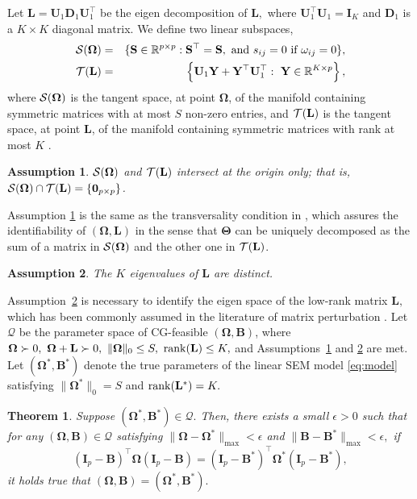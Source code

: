 \documentclass[12pt]{article}
\newtheorem{theorem}{Theorem}
\newcommand{\PA}{{\mathcal Q}}
\def\rank{\mathop{\rm rank}}
\newtheorem{Assumption}{Assumption}
\newcommand{\OOO}{\boldsymbol \Omega}
\newcommand{\TTT}{\boldsymbol \Theta}
\newcommand{\BB}{\mathbf B}
\newcommand{\DD}{\mathbf D}
\newcommand{\YY}{\mbox{$\mathbf Y$}}
\newcommand{\II}{\mathbf I}
\newcommand{\LL}{\mathbf L}
\newcommand{\R}{\mathbb R}
\newcommand{\SSS}{\mathbf S}
\newcommand{\UU}{\mathbf U}
\newcommand{\1}{\uppercase\expandafter{\romannumeral1}}
\newcommand{\2}{\uppercase\expandafter{\romannumeral2}}
\newcommand{\0}{\textbf{0}}
\begin{document}
Let $\LL = \UU_1 \DD_1 \UU_1^\top$ be the eigen decomposition of $\LL,$ where $\UU_1^\top \UU_1 = \II_K$ and $\DD_1$ is a $K\times K$ diagonal matrix. We define two linear subspaces, 
\begin{eqnarray}
{\cal S}(\OOO) &=& \{\SSS\in\R^{p\times p}: \SSS^\top = \SSS,~\text{and}~s_{ij} = 0~\text{if}~\omega_{ij} = 0\}, \label{eq:tangent S} \\
{\cal T}(\LL) &=& \left\{ \UU_1\YY+\YY^\top\UU_1^\top:~ \YY \in \R^{K\times p} \right\}, \label{eq:tangent L}
\end{eqnarray}
where ${\cal S}(\OOO)$ is the tangent space, at point $\OOO$, of the manifold containing symmetric matrices with at most $S$ non-zero entries, and ${\cal T}(\LL)$ 
is the tangent space, at point $\LL$, of the manifold containing symmetric matrices with rank at most $K$ \citep{Chandrasekaran2011}. 

\begin{Assumption}\label{ass:tangent}
${\cal S}(\OOO)$ and ${\cal T}(\LL)$ intersect at the origin only; that is, ${\cal S}(\OOO) \cap {\cal T}(\LL) = \{\mathbf{0}_{p\times p}\}$.	
\end{Assumption}

Assumption \ref{ass:tangent} is the same as the transversality condition in \cite{Chandrasekaran2011}, which assures the identifiability of $(\OOO,\LL)$ in the sense that $\TTT$ can be uniquely decomposed as the sum of a matrix in ${\cal S}(\OOO)$ and the other one in ${\cal T}(\LL)$.  

\begin{Assumption}\label{ass:diff}
The $K$ eigenvalues of $\LL$ are distinct.
\end{Assumption}

Assumption~\ref{ass:diff} is necessary to identify the eigen space of the low-rank matrix $\LL,$ which has been commonly assumed in the literature of matrix perturbation \cite{yu2015useful}. 
Let $\PA$ be the parameter space of CG-feasible $(\OOO,\BB)$, where $\OOO\succ0,~\OOO+\LL\succ0,~\|\OOO\|_0\leq S,~\rank(\LL)\leq K,$ and Assumptions~\ref{ass:tangent} and \ref{ass:diff} are met. Let $(\OOO^*,\BB^*)$ denote the true parameters of the linear SEM model \eqref{eq:model} satisfying $\|\OOO^*\|_0 = S$ and $\rank(\LL^*)=K.$

\begin{theorem}\label{thm:ident}
Suppose $(\OOO^*,\BB^*)\in\PA.$ Then, there exists a small $\epsilon>0$ such that for any $(\OOO, \BB)\in\PA$ satisfying $\| \OOO-\OOO^*\|_{\max}<\epsilon$ and $\|\BB-\BB^*\|_{\max}<\epsilon,$ if $$
(\mathbf{I}_p-\BB)^\top\OOO (\mathbf{I}_p-\BB)=(\mathbf{I}_p-\BB^*)^\top \OOO^* (\mathbf{I}_p-\BB^*),
$$ 
it holds true that $(\OOO, \BB) = (\OOO^*,\BB^*).$
\end{theorem}
\end{document}
